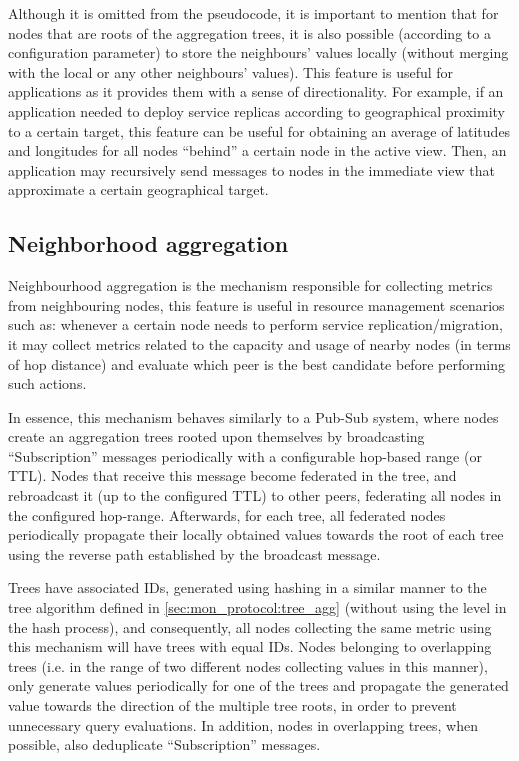 Although it is omitted from the pseudocode, it is important to mention that for nodes that are roots of the aggregation trees, it is also possible (according to a configuration parameter) to store the neighbours' values locally (without merging with the local or any other neighbours' values). This feature is useful for applications as it provides them with a sense of directionality. For example, if an application needed to deploy service replicas according to geographical proximity to a certain target, this feature can be useful for obtaining an average of latitudes and longitudes for all nodes ``behind'' a certain node in the active view. Then, an application may recursively send messages to nodes in the immediate view that approximate a certain geographical target. 


\subsection{Neighborhood aggregation} \label{sec:mon_protocol:neigh_agg}

Neighbourhood aggregation is the mechanism responsible for collecting metrics from neighbouring nodes, this feature is useful in resource management scenarios such as: whenever a certain node needs to perform service replication/migration, it may collect metrics related to the capacity and usage of nearby nodes (in terms of hop distance) and evaluate which peer is the best candidate before performing such actions. 

In essence, this mechanism behaves similarly to a Pub-Sub system, where nodes create an aggregation trees rooted upon themselves by broadcasting ``Subscription'' messages periodically with a configurable hop-based range (or TTL).  Nodes that receive this message become federated in the tree, and rebroadcast it (up to the configured TTL) to other peers, federating all nodes in the configured hop-range. Afterwards, for each tree, all federated nodes periodically propagate their locally obtained values towards the root of each tree using the reverse path established by the broadcast message. 

Trees have associated IDs, generated using hashing in a similar manner to the tree algorithm defined in \ref{sec:mon_protocol:tree_agg} (without using the level in the hash process), and consequently, all nodes collecting the same metric using this mechanism will have trees with equal IDs. Nodes belonging to overlapping trees (i.e. in the range of two different nodes collecting values in this manner), only generate values periodically for one of the trees and propagate the generated value towards the direction of the multiple tree roots, in order to prevent unnecessary query evaluations. In addition, nodes in overlapping trees, when possible, also deduplicate ``Subscription'' messages.

